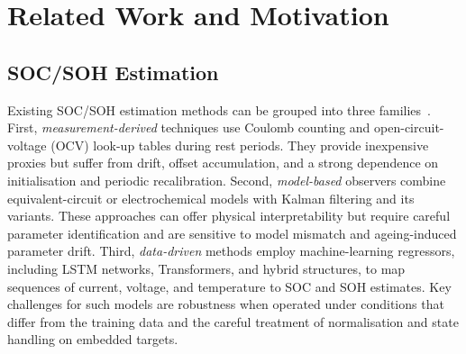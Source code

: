 \documentclass[final,3p,times]{elsarticle}
\begin{document}
\section{Related Work and Motivation}
\subsection{SOC/SOH Estimation}
Existing SOC/SOH estimation methods can be grouped into three families~\cite{a.m.s.m.h.s.attanayakaEstimationStateCharge2019,berecibarCriticalReviewState2016,shrivastavaReviewTechnologicalAdvancement2023,guoSystematicReviewElectrochemical2024}. First, \emph{measurement-derived} techniques use Coulomb counting and open-circuit-voltage (OCV) look-up tables during rest periods. They provide inexpensive proxies but suffer from drift, offset accumulation, and a strong dependence on initialisation and periodic recalibration. Second, \emph{model-based} observers combine equivalent-circuit or electrochemical models with Kalman filtering and its variants. These approaches can offer physical interpretability but require careful parameter identification and are sensitive to model mismatch and ageing-induced parameter drift. Third, \emph{data-driven} methods employ machine-learning regressors, including LSTM networks, Transformers, and hybrid structures, to map sequences of current, voltage, and temperature to SOC and SOH estimates. Key challenges for such models are robustness when operated under conditions that differ from the training data and the careful treatment of normalisation and state handling on embedded targets.
\end{document}

